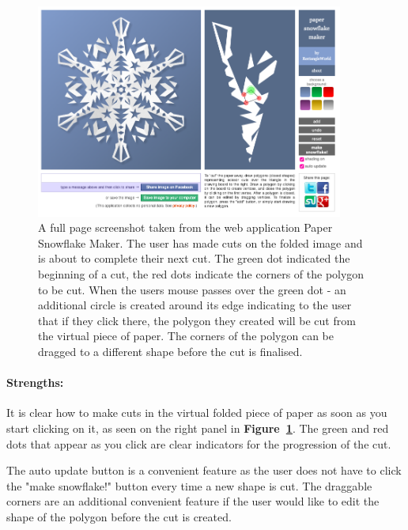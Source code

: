 \documentclass[11pt]{article}
\begin{document}
                    \begin{figure}[ht]\centering\includegraphics[width=0.9\textwidth]{Images/paperSnowflakeMaker}
                        \caption{
                        \label{fig:paperSnowflakeMaker}
                        A full page screenshot taken from the web application Paper Snowflake Maker. The user has made cuts on the folded image and is about to complete their next cut. The green dot indicated the beginning of a cut, the red dots indicate the corners of the polygon to be cut. When the users mouse passes over the green dot - an additional circle is created around its edge indicating to the user that if they click there, the polygon they created will be cut from the virtual piece of paper. The corners of the polygon can be dragged to a different shape before the cut is finalised.}
                    \end{figure}
                    
                \paragraph{Strengths:}
                It is clear how to make cuts in the virtual folded piece of paper as soon as you start clicking on it, as seen on the right panel in \textbf{Figure~\ref{fig:paperSnowflakeMaker}}. The green and red dots that appear as you click are clear indicators for the progression of the cut.
                
                The auto update button is a convenient feature as the user does not have to click the "make snowflake!" button every time a new shape is cut. The draggable corners are an additional convenient feature if the user would like to edit the shape of the polygon before the cut is created.
                 
\end{document}
